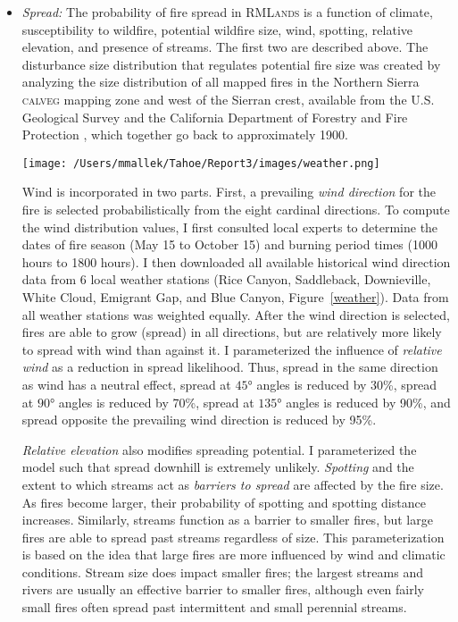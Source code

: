 \begin{itemize}



\item \emph{Spread:} The probability of fire spread in \textsc{RMLands} is a function of climate, susceptibility to wildfire, potential wildfire size, wind, spotting, relative elevation, and presence of streams. The first two are described above. The disturbance size distribution that regulates potential fire size was created by analyzing the size distribution of all mapped fires in the Northern Sierra \textsc{calveg} mapping zone and west of the Sierran crest, available from the U.S. Geological Survey and the California Department of Forestry and Fire Protection \citep{calfire2012,usgs-fire-data2012}, which together go back to approximately 1900. 

\begin{minipage}{\linewidth}
 \centering
 \texttt{[image: /Users/mmallek/Tahoe/Report3/images/weather.png]}
  \label{weather}
\end{minipage}

Wind is incorporated in two parts. First, a prevailing \emph{wind direction} for the fire is selected probabilistically from the eight cardinal directions. To compute the wind distribution values, I first consulted local experts to determine the dates of fire season (May 15 to October 15) and burning period times (1000 hours to 1800 hours). I then downloaded all available historical wind direction data from 6 local weather stations (Rice Canyon, Saddleback, Downieville, White Cloud, Emigrant Gap, and Blue Canyon, Figure~\ref{weather}). Data from all weather stations was weighted equally. After the wind direction is selected, fires are able to grow (spread) in all directions, but are relatively more likely to spread with wind than against it. I parameterized the influence of \emph{relative wind} as a reduction in spread likelihood. Thus, spread in the same direction as wind has a neutral effect, spread at $\ang{45}$ angles is reduced by 30\%, spread at $\ang{90}$  angles is reduced by 70\%, spread at $\ang{135}$ angles is reduced by 90\%, and spread opposite the prevailing wind direction is reduced by 95\%. 

\emph{Relative elevation} also modifies spreading potential. I parameterized the model such that spread downhill is extremely unlikely. \emph{Spotting} and the extent to which streams act as \emph{barriers to spread} are affected by the fire size. As fires become larger, their probability of spotting and spotting distance increases. Similarly, streams function as a barrier to smaller fires, but large fires are able to spread past streams regardless of size. This parameterization is based on the idea that large fires are more influenced by wind and climatic conditions. Stream size does impact smaller fires; the largest streams and rivers are usually an effective barrier to smaller fires, although even fairly small fires often spread past intermittent and small perennial streams. 



\end{itemize}
